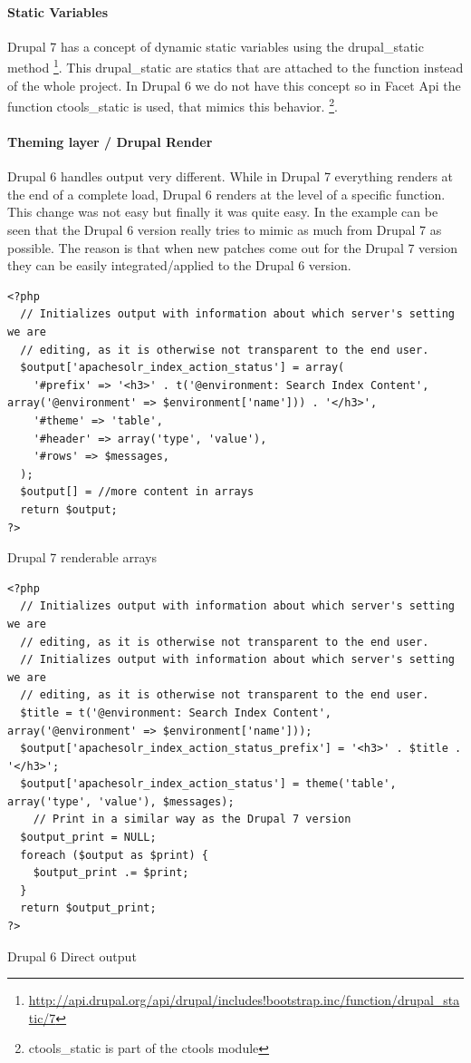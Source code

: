 \paragraph{Static Variables}
Drupal 7 has a concept of dynamic static variables using the drupal\_static method \footnote{\url{http://api.drupal.org/api/drupal/includes!bootstrap.inc/function/drupal_static/7}}. This drupal\_static are statics that are attached to the function instead of the whole project. In Drupal 6 we do not have this concept so in Facet Api the function ctools\_static is used, that mimics this behavior. \footnote{ctools\_static is part of the ctools module}.

\paragraph{Theming layer / Drupal Render}
Drupal 6 handles output very different. While in Drupal 7 everything renders at the end of a complete load, Drupal 6 renders at the level of a specific function. This change was not easy but finally it was quite easy. In the example can be seen that the Drupal 6 version really tries to mimic as much from Drupal 7 as possible. The reason is that when new patches come out for the Drupal 7 version they can be easily integrated/applied to the Drupal 6 version. 

\begin{verbatim}
<?php
  // Initializes output with information about which server's setting we are
  // editing, as it is otherwise not transparent to the end user.
  $output['apachesolr_index_action_status'] = array(
    '#prefix' => '<h3>' . t('@environment: Search Index Content', array('@environment' => $environment['name'])) . '</h3>',
    '#theme' => 'table',
    '#header' => array('type', 'value'),
    '#rows' => $messages,
  );
  $output[] = //more content in arrays
  return $output;
?>
\end{verbatim}
\caption{Drupal 7 renderable arrays}

\begin{verbatim}
<?php
  // Initializes output with information about which server's setting we are
  // editing, as it is otherwise not transparent to the end user.
  // Initializes output with information about which server's setting we are
  // editing, as it is otherwise not transparent to the end user.
  $title = t('@environment: Search Index Content', array('@environment' => $environment['name']));
  $output['apachesolr_index_action_status_prefix'] = '<h3>' . $title . '</h3>';
  $output['apachesolr_index_action_status'] = theme('table', array('type', 'value'), $messages);
    // Print in a similar way as the Drupal 7 version
  $output_print = NULL;
  foreach ($output as $print) {
    $output_print .= $print;
  }
  return $output_print;
?>
\end{verbatim}
\caption{Drupal 6 Direct output}

